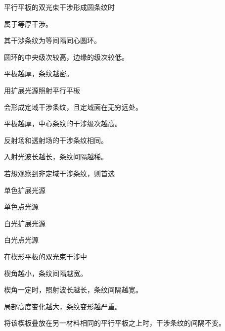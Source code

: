 \documentclass[padl, analysis, notocnum]{ExBook}
\newcommand{\answerarea}[1][3.5cm]{%
  \par\vspace{1mm}%
  \noindent{\color{themeColor!35}\rule{\linewidth}{0.4pt}}\par
  \noindent\begin{minipage}[t][#1][t]{\linewidth}\vspace{0pt}\end{minipage}\par
  \noindent{\color{themeColor!35}\rule{\linewidth}{0.4pt}}\par
}
\begin{document}
\begin{qitems}[startnum=7]
\qitem 平行平板的双光束干涉形成圆条纹时
\par\noindent\hspace{2em}属于等厚干涉。
\par\noindent\hspace{2em}其干涉条纹为等间隔同心圆环。
\par\noindent\hspace{2em}圆环的中央级次较高，边缘的级次较低。
\par\noindent\hspace{2em}平板越厚，条纹越密。
\label{q:210:start}
\answerarea[4.0cm]
\label{q:210:end}
\end{qitems}

\begin{qitems}[startnum=8]
\qitem 用扩展光源照射平行平板
\par\noindent\hspace{2em}会形成定域干涉条纹，且定域面在无穷远处。
\par\noindent\hspace{2em}平板越厚，中心条纹的干涉级次越高。
\par\noindent\hspace{2em}反射场和透射场的干涉条纹相同。
\par\noindent\hspace{2em}入射光波长越长，条纹间隔越稀。
\label{q:211:start}
\answerarea[4.0cm]
\label{q:211:end}
\end{qitems}

\begin{qitems}[startnum=9]
\qitem 若想观察到非定域干涉条纹，则首选
\par\noindent\hspace{2em}单色扩展光源
\par\noindent\hspace{2em}单色点光源
\par\noindent\hspace{2em}白光扩展光源
\par\noindent\hspace{2em}白光点光源
\label{q:212:start}
\answerarea[4.0cm]
\label{q:212:end}
\end{qitems}

\begin{qitems}[startnum=10]
\qitem 在楔形平板的双光束干涉中
\par\noindent\hspace{2em}楔角越小，条纹间隔越宽。
\par\noindent\hspace{2em}楔角一定时，照射波长越长，条纹间隔越宽。
\par\noindent\hspace{2em}局部高度变化越大，条纹变形越严重。
\par\noindent\hspace{2em}将该楔板叠放在另一材料相同的平行平板之上时，干涉条纹的间隔不变。
\label{q:213:start}
\answerarea[4.0cm]
\label{q:213:end}
\end{qitems}
\end{document}
